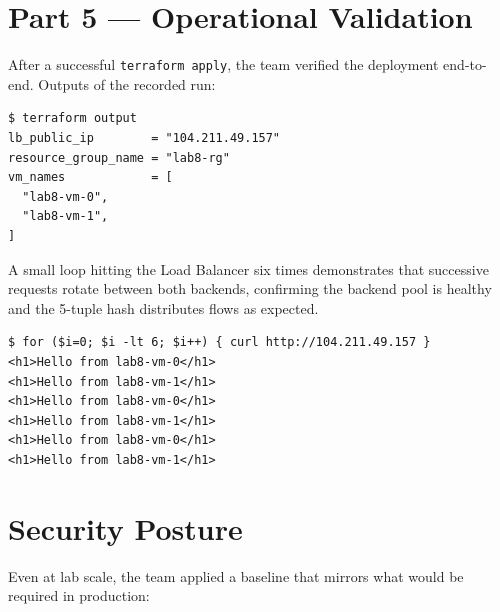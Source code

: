\documentclass[10pt,a4paper,twocolumn]{article}
\begin{document}
\section{Part 5 --- Operational Validation}

After a successful \texttt{terraform apply}, the team verified the
deployment end-to-end. Outputs of the recorded run:

\begin{lstlisting}[style=shellcode, caption={Outputs surfaced by the root module after apply}]
$ terraform output
lb_public_ip        = "104.211.49.157"
resource_group_name = "lab8-rg"
vm_names            = [
  "lab8-vm-0",
  "lab8-vm-1",
]
\end{lstlisting}

A small loop hitting the Load Balancer six times demonstrates that
successive requests rotate between both backends, confirming the
backend pool is healthy and the 5-tuple hash distributes flows as
expected.

\begin{lstlisting}[style=shellcode, caption={Round-robin verification against the LB Public IP}]
$ for ($i=0; $i -lt 6; $i++) { curl http://104.211.49.157 }
<h1>Hello from lab8-vm-0</h1>
<h1>Hello from lab8-vm-1</h1>
<h1>Hello from lab8-vm-0</h1>
<h1>Hello from lab8-vm-1</h1>
<h1>Hello from lab8-vm-0</h1>
<h1>Hello from lab8-vm-1</h1>
\end{lstlisting}

\section{Security Posture}

Even at lab scale, the team applied a baseline that mirrors what would
be required in production:
\end{document}

